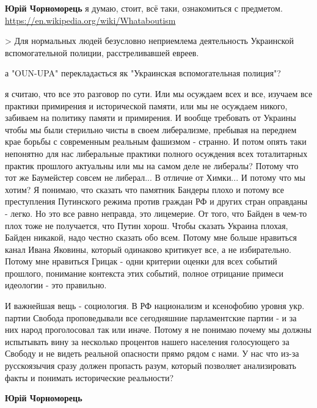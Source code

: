 \begin{itemize}
\begin{itemize}
\textbf{Юрій Чорноморець} я думаю, стоит, всё таки, ознакомиться с предметом.
\url{https://en.wikipedia.org/wiki/Whataboutism}


> Для нормальных людей безусловно неприемлема деятельность Украинской
вспомогательной полиции, расстреливавшей евреев.

а "OUN-UPA" перекладається як "Украинская вспомогательная полиция"?


я считаю, что все это разговор по сути. Или мы осуждаем всех и все, изучаем все
практики примирения и исторической памяти, или мы не осуждаем никого, забиваем
на политику памяти и примирения. И вообще требовать от Украины чтобы мы были
стерильно чисты в своем либерализме, пребывая на переднем крае борьбы с
современным реальным фашизмом - странно. И потом опять таки непонятно для нас
либеральные практики полного осуждения всех тоталитарных практик прошлого
актуальны или мы на самом деле не либералы? Потому что тот же Баумейстер совсем
не либерал... В отличие от Химки... И потому что мы хотим? Я понимаю, что
сказать что памятник Бандеры плохо и потому все преступления Путинского режима
против граждан РФ и других стран оправданы - легко. Но это все равно неправда,
это лицемерие. От того, что Байден в чем-то плох тоже не получается, что Путин
хорош. Чтобы сказать Украина плохая, Байден никакой, надо честно сказать обо
всем. Потому мне больше нравиться канал Ивана Яковины, который одинаково
критикует все, а не избирательно. Потому мне нравиться Грицак - одни критерии
оценки для всех событий прошлого, понимание контекста этих событий, полное
отрицание примеси идеологии - это правильно.


И важнейшая вещь - социология. В РФ национализм и ксенофобию уровня укр. партии
Свобода проповедывали все сегодняшние парламентские партии - и за них народ
проголосовал так или иначе. Потому я не понимаю почему мы должны испытывать
вину за несколько процентов нашего населения голосующего за Свободу и не видеть
реальной опасности прямо рядом с нами. У нас что из-за русскоязычия сразу
должен пропасть разум, который позволяет анализировать факты и понимать
исторические реальности?


\textbf{Юрій Чорноморець} 


\end{itemize}
\end{itemize}
